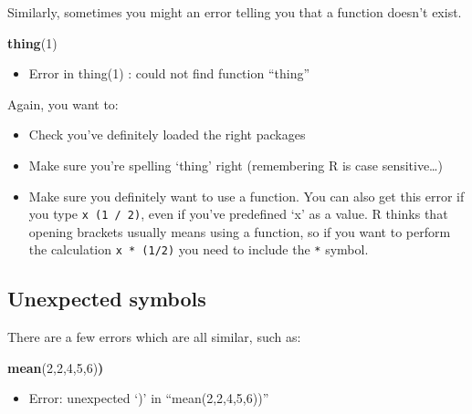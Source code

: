 \documentclass[
]{book}
\newenvironment{Shaded}{\begin{snugshade}}{\end{snugshade}}
\newcommand{\DecValTok}[1]{\textcolor[rgb]{0.00,0.00,0.81}{#1}}
\newcommand{\ErrorTok}[1]{\textcolor[rgb]{0.64,0.00,0.00}{\textbf{#1}}}
\newcommand{\KeywordTok}[1]{\textcolor[rgb]{0.13,0.29,0.53}{\textbf{#1}}}
\newcommand{\NormalTok}[1]{#1}
\providecommand{\tightlist}{%
  \setlength{\itemsep}{0pt}\setlength{\parskip}{0pt}}
\begin{document}
Similarly, sometimes you might an error telling you that a function doesn't exist.

\begin{Shaded}
\begin{Highlighting}[]
\KeywordTok{thing}\NormalTok{(}\DecValTok{1}\NormalTok{)}
\end{Highlighting}
\end{Shaded}

\begin{itemize}
\tightlist
\item
  Error in thing(1) : could not find function ``thing''
\end{itemize}

Again, you want to:

\begin{itemize}
\item
  Check you've definitely loaded the right packages
\item
  Make sure you're spelling `thing' right (remembering R is case sensitive\ldots{})
\item
  Make sure you definitely want to use a function. You can also get this error if you type \texttt{x\ (1\ /\ 2)}, even if you've predefined `x' as a value. R thinks that opening brackets usually means using a function, so if you want to perform the calculation \texttt{x\ *\ (1/2)} you need to include the \texttt{*} symbol.
\end{itemize}

\hypertarget{unexpected-symbols}{%
\subsection{Unexpected symbols}\label{unexpected-symbols}}

There are a few errors which are all similar, such as:

\begin{Shaded}
\begin{Highlighting}[]
\KeywordTok{mean}\NormalTok{(}\DecValTok{2}\NormalTok{,}\DecValTok{2}\NormalTok{,}\DecValTok{4}\NormalTok{,}\DecValTok{5}\NormalTok{,}\DecValTok{6}\NormalTok{)}\ErrorTok{)}
\end{Highlighting}
\end{Shaded}

\begin{itemize}
\tightlist
\item
  Error: unexpected `)' in ``mean(2,2,4,5,6))''
\end{itemize}
\end{document}
